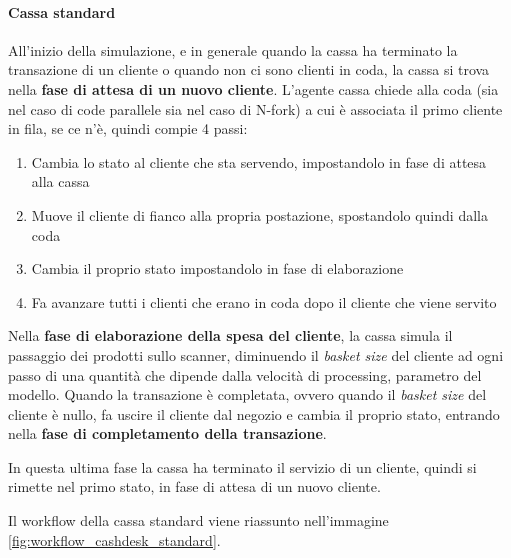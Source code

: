 \paragraph{Cassa standard}
All'inizio della simulazione, e in generale quando la cassa ha terminato la transazione di un cliente o quando non ci sono clienti in coda, la cassa si trova nella \textbf{fase di attesa di un nuovo cliente}. L'agente cassa chiede alla coda (sia nel caso di code parallele sia nel caso di N-fork) a cui è associata il primo cliente in fila, se ce n'è, quindi compie 4 passi:
\begin{enumerate}
\item Cambia lo stato al cliente che sta servendo, impostandolo in fase di attesa alla cassa
\item Muove il cliente di fianco alla propria postazione, spostandolo quindi dalla coda
\item Cambia il proprio stato impostandolo in fase di elaborazione
\item Fa avanzare tutti i clienti che erano in coda dopo il cliente che viene servito
\end{enumerate}

Nella \textbf{fase di elaborazione della spesa del cliente}, la cassa simula il passaggio dei prodotti sullo scanner, diminuendo il \textit{basket size} del cliente ad ogni passo di una quantità che dipende dalla velocità di processing, parametro del modello. Quando la transazione è completata, ovvero quando il \textit{basket size} del cliente è nullo, fa uscire il cliente dal negozio e cambia il proprio stato, entrando nella \textbf{fase di completamento della transazione}.

In questa ultima fase la cassa ha terminato il servizio di un cliente, quindi si rimette nel primo stato, in fase di attesa di un nuovo cliente.

Il workflow della cassa standard viene riassunto nell'immagine \ref{fig:workflow_cashdesk_standard}.

